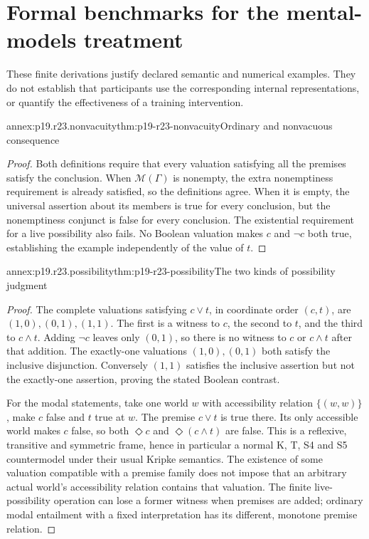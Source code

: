 \section{Formal benchmarks for the mental-models treatment}
\label{sec:annex-p19-rationality-2-3}

These finite derivations justify declared semantic and numerical examples.
They do not establish that participants use the corresponding internal
representations, or quantify the effectiveness of a training intervention.

\begin{annexitem}{annex:p19.r23.nonvacuity}{thm:p19-r23-nonvacuity}{Ordinary and nonvacuous consequence}
\begin{proof}
Both definitions require that every valuation satisfying all the premises
satisfy the conclusion. When \(\mathcal M(\Gamma)\) is nonempty,
the extra nonemptiness requirement is already satisfied, so the definitions
agree. When it is empty, the universal assertion about its members is
true for every conclusion, but the nonemptiness conjunct is false for
every conclusion. The existential requirement for a live possibility
also fails. No Boolean valuation makes \(c\) and \(\neg c\) both
true, establishing the example independently of the value of \(t\).
\end{proof}
\end{annexitem}

\begin{annexitem}{annex:p19.r23.possibility}{thm:p19-r23-possibility}{The two kinds of possibility judgment}
\begin{proof}
The complete valuations satisfying \(c\lor t\), in coordinate order
\((c,t)\), are \((1,0),(0,1),(1,1)\). The first is a witness to
\(c\), the second to \(t\), and the third to \(c\land t\).
Adding \(\neg c\) leaves only \((0,1)\), so there is no witness
to \(c\) or \(c\land t\) after that addition.
The exactly-one valuations \((1,0),(0,1)\) both satisfy the inclusive
disjunction. Conversely \((1,1)\) satisfies the inclusive assertion
but not the exactly-one assertion, proving the stated Boolean contrast.

For the modal statements, take one world \(w\) with accessibility
relation \(\{(w,w)\}\), make \(c\) false and \(t\) true at
\(w\). The premise \(c\lor t\) is true there. Its only accessible
world makes \(c\) false, so both \(\Diamond c\) and
\(\Diamond(c\land t)\) are false. This is a reflexive, transitive
and symmetric frame, hence in particular a normal K, T, S4 and S5
countermodel under their usual Kripke semantics. The existence of some
valuation compatible with a premise family does not impose that an
arbitrary actual world's accessibility relation contains that valuation.
The finite live-possibility operation can lose a former witness when
premises are added; ordinary modal entailment with a fixed interpretation
has its different, monotone premise relation.
\end{proof}
\end{annexitem}

